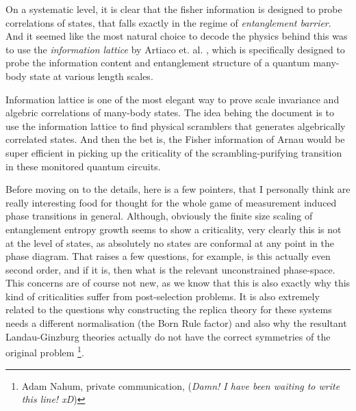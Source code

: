 On a systematic level, it is clear that the fisher information is designed to probe correlations of states, that falls exactly in the regime of \textit{entanglement barrier}. And it seemed like the most natural choice to decode the physics behind this was to use the \textit{information lattice} by Artiaco et. al. \cite{Artiaco2024EfficientLargePRXQuantum}, which is specifically designed to probe the information content and entanglement structure of a quantum many-body state at various length scales. 


Information lattice is one of the most elegant way to prove scale invariance and algebric correlations of many-body states. The idea behing the document is to use the information lattice to find physical scramblers that generates algebrically correlated states. And then the bet is, the Fisher information of Arnau would be super efficient in picking up the criticality of the scrambling-purifying transition in these monitored quantum circuits.


\begin{notes}
Before moving on to the details, here is a few pointers, that I personally think are really interesting food for thought for the whole game of measurement induced phase transitions in general. Although, obviously the finite size scaling of entanglement entropy growth seems to show a criticality, very clearly this is not at the level of states, as absolutely no states are conformal at any point in the phase diagram. That raises a few questions, for example, is this actually even second order, and if it is, then what is the relevant unconstrained phase-space. This concerns are of course not new, as we know that this is also exactly why this kind of criticalities suffer from post-selection problems. It is also extremely related to the questions why constructing the replica theory for these systems needs a different normalisation (the Born Rule factor) and also why the resultant Landau-Ginzburg theories \cite{Adam2021MeasurementEntanglementPRXQuantumTheTheoryOfEverythingPaper} actually do not have the correct symmetries of the original problem \footnote{ Adam Nahum, private communication, (\textit{Damn! I have been waiting to write this line! xD})}.
\end{notes}